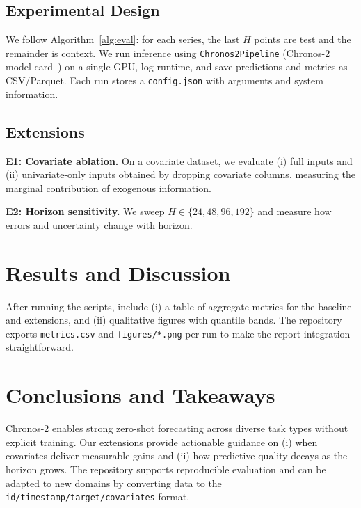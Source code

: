 \documentclass[conference]{IEEEtran}
\begin{document}
\subsection{Experimental Design}
We follow Algorithm~\ref{alg:eval}: for each series, the last $H$ points are test and the remainder is context. We run inference using \texttt{Chronos2Pipeline} (Chronos-2 model card~\cite{chronos2hf}) on a single GPU, log runtime, and save predictions and metrics as CSV/Parquet. Each run stores a \texttt{config.json} with arguments and system information.

\subsection{Extensions}
\textbf{E1: Covariate ablation.} On a covariate dataset, we evaluate (i) full inputs and (ii) univariate-only inputs obtained by dropping covariate columns, measuring the marginal contribution of exogenous information.

\textbf{E2: Horizon sensitivity.} We sweep $H\in\{24,48,96,192\}$ and measure how errors and uncertainty change with horizon.

\section{Results and Discussion}
After running the scripts, include (i) a table of aggregate metrics for the baseline and extensions, and (ii) qualitative figures with quantile bands. The repository exports \texttt{metrics.csv} and \texttt{figures/*.png} per run to make the report integration straightforward.

\section{Conclusions and Takeaways}
Chronos-2 enables strong zero-shot forecasting across diverse task types without explicit training. Our extensions provide actionable guidance on (i) when covariates deliver measurable gains and (ii) how predictive quality decays as the horizon grows. The repository supports reproducible evaluation and can be adapted to new domains by converting data to the \texttt{id/timestamp/target/covariates} format.



\end{document}
